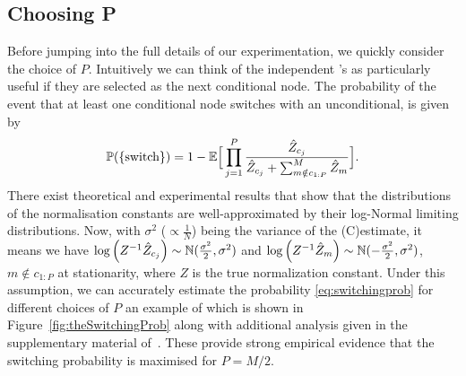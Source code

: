

\subsection{Choosing P}
\label{sec:part:ipmcmc:choosingP}
Before jumping into the full details of our experimentation, we quickly consider the choice of $P$. Intuitively we can think of the independent \smc's as particularly useful if they are selected as the next conditional node. The probability of the event %
that at least one conditional node switches with an unconditional, is given by
\begin{align}
\label{eq:switchingprob}
\mathbb{P}(\{\text{switch}\}) 
= 1 - \mathbb{E}\Big[\prod_{j=1}^P \frac{\hat Z_{c_j}}{\hat Z_{c_j} +\sum_{m \notin c_{1:P}}^M \hat Z_{m}}\Big].
\end{align}
There exist theoretical and experimental results \citep{pitt2012some,berard2014lognormal,doucet2015efficient} that show that the distributions of the normalisation constants are well-approximated by their log-Normal limiting distributions. Now, with $\sigma^2$ ($\propto \frac{1}{N}$) being the variance of the (C)\smc estimate, it means we have $\log \left(Z^{-1} \hat Z_{c_j} \right) \sim \mathbb{N}(\frac{\sigma^2}{2},\sigma^2)$ and $\log \left(Z^{-1} \hat Z_{m} \right) \sim \mathbb{N}(-\frac{\sigma^2}{2},\sigma^2)$, $m\notin c_{1:P}$ at stationarity, where $Z$ is the true normalization constant. Under this assumption, we can accurately estimate the probability \eqref{eq:switchingprob} for different choices of $P$ an example of which is shown in Figure~\ref{fig:theSwitchingProb} along with additional analysis given in the supplementary material of~\cite{rainforth2016interacting}. These provide strong empirical evidence that the switching probability is maximised for $P=M/2$.

